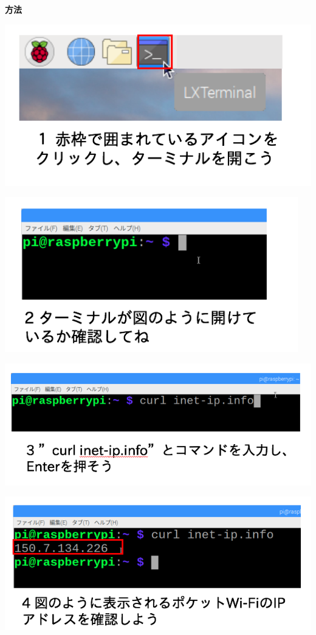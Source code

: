 \documentclass[a4paper,12pt,dvipdfmx]{jarticle}
\begin{document}
\bigskip

{\bfseries
	方法}



\centering
\includegraphics[width=13.942cm]{ome7-img007.png}

\centering
\includegraphics[width=12.746cm]{ome7-img008.png}
\flushleft


\bigskip


\bigskip


\bigskip


\bigskip



\centering
\includegraphics[width=13.716cm]{ome7-img018.png}

\centering
\includegraphics[width=13.85cm]{ome7-img019.png}
\flushleft
\end{document}
